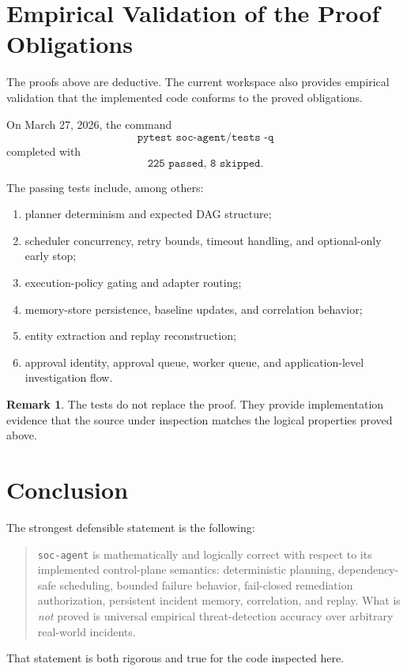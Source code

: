\documentclass[11pt]{article}
\theoremstyle{definition}
\newtheorem{remark}{Remark}
\begin{document}
\section{Empirical Validation of the Proof Obligations}
The proofs above are deductive. The current workspace also provides empirical validation that the
implemented code conforms to the proved obligations.

On March 27, 2026, the command
\[
\texttt{pytest soc-agent/tests -q}
\]
completed with
\[
\texttt{225 passed,\ 8 skipped}.
\]

The passing tests include, among others:
\begin{enumerate}[label=(\arabic*)]
\item planner determinism and expected DAG structure;
\item scheduler concurrency, retry bounds, timeout handling, and optional-only early stop;
\item execution-policy gating and adapter routing;
\item memory-store persistence, baseline updates, and correlation behavior;
\item entity extraction and replay reconstruction;
\item approval identity, approval queue, worker queue, and application-level investigation flow.
\end{enumerate}

\begin{remark}
The tests do not replace the proof. They provide implementation evidence that the source under
inspection matches the logical properties proved above.
\end{remark}

\section{Conclusion}
The strongest defensible statement is the following:

\begin{quote}
\texttt{soc-agent} is mathematically and logically correct with respect to its implemented
control-plane semantics: deterministic planning, dependency-safe scheduling, bounded failure
behavior, fail-closed remediation authorization, persistent incident memory, correlation, and replay.
What is \emph{not} proved is universal empirical threat-detection accuracy over arbitrary
real-world incidents.
\end{quote}

That statement is both rigorous and true for the code inspected here.
\end{document}
